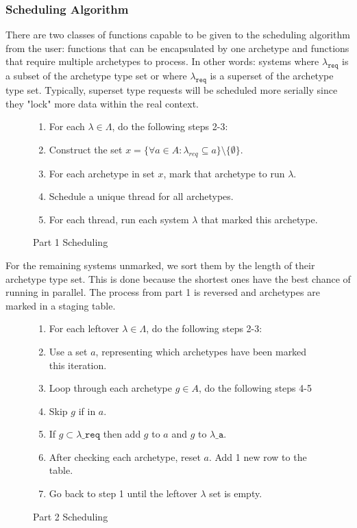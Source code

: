 \subsubsection{Scheduling Algorithm}
There are two classes of functions capable to be given to the scheduling algorithm from the user: functions that can be encapsulated by one archetype and functions that require multiple archetypes to process. In other words: systems where $\lambda_{\texttt{req}}$ is a subset of the archetype type set or where $\lambda_{\texttt{req}}$ is a superset of the archetype type set. Typically, superset type requests will be scheduled more serially since they "lock" more data within the real context. 

\begin{figure}[H]
    \begin{enumerate}
        \item For each $\lambda \in \Lambda$, do the following steps 2-3:
        \item Construct the set $x = \{\forall a \in A : \lambda_{req} \subseteq a \} \setminus \{\emptyset\}$.
        \item For each archetype in set $x$, mark that archetype to run $\lambda$.
        \item Schedule a unique thread for all archetypes.
        \item For each thread, run each system $\lambda$ that marked this archetype.
    \end{enumerate}
    \caption{Part 1 Scheduling}
\end{figure}

For the remaining systems unmarked, we sort them by the length of their archetype type set. This is done because the shortest ones have the best chance of running in parallel. The process from part 1 is reversed and archetypes are marked in a staging table. 

\begin{figure}[H]
    \begin{enumerate}
        \item For each leftover $\lambda \in \Lambda$, do the following steps 2-3:
        \item Use a set $a$, representing which archetypes have been marked this iteration.
        \item Loop through each archetype $g \in A$, do the following steps 4-5
        \item Skip $g$ if in $a$.
        \item If $g \subset \lambda\_{\texttt{req}}$ then add $g$ to $a$ and $g$ to $\lambda\_{\texttt{a}}$.
        \item After checking each archetype, reset $a$. Add 1 new row to the table.
        \item Go back to step 1 until the leftover $\lambda$ set is empty.
    \end{enumerate}
    \caption{Part 2 Scheduling}
\end{figure}

